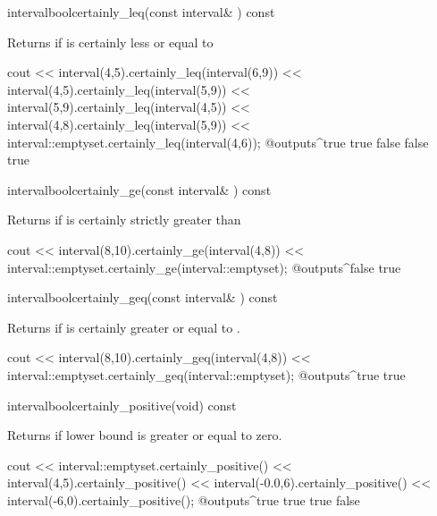\documentclass{manual}
\newcommand{\itv}[2]{\ensuremath{[#1,\,#2]}}
\let\leq=\leqslant
\let\geq=\geqslant
\begin{document}
\begin{defmethod}{interval}{bool}{certainly\_leq}{(const interval\& ) const}
  \begin{operation}
    \op{$\forall x\in \code{self}, \forall y \in \var{I}\colon x\leq y$}
  \end{operation}
  Returns  if  is certainly less or equal to 
  \begin{example}
cout << interval(4,5).certainly_leq(interval(6,9))
     << interval(4,5).certainly_leq(interval(5,9))
     << interval(5,9).certainly_leq(interval(4,5))
     << interval(4,8).certainly_leq(interval(5,9))
     << interval::emptyset.certainly_leq(interval(4,6));
@outputs^true true false false true~
\end{example}
\end{defmethod}

\begin{defmethod}{interval}{bool}{certainly\_ge}{(const interval\& ) const}
  \begin{operation}
  \end{operation}
  Returns  if  is certainly strictly greater than 
  \begin{example}
cout << interval(8,10).certainly_ge(interval(4,8))
     << interval::emptyset.certainly_ge(interval::emptyset);
@outputs^false true~
  \end{example}
\end{defmethod}

\begin{defmethod}{interval}{bool}{certainly\_geq}{(const interval\& ) const}
  \begin{operation}
    \op{$\forall x\in \code{self}, \forall y \in \var{I}\colon x\geq y$}
  \end{operation}
  Returns  if  is certainly greater or equal to .
  \begin{example}
cout << interval(8,10).certainly_geq(interval(4,8))
     << interval::emptyset.certainly_geq(interval::emptyset);
@outputs^true true~
  \end{example}
\end{defmethod}

\begin{defmethod}{interval}{bool}{certainly\_positive}{(void) const}
  \begin{operation}
    \op{$\code{self}\subseteq\itv{0}{+\infty}$}
  \end{operation}
Returns  if  lower bound is greater or equal to zero.
\begin{example}
cout << interval::emptyset.certainly_positive()
     << interval(4,5).certainly_positive()
     << interval(-0.0,6).certainly_positive()
     << interval(-6,0).certainly_positive();
@outputs^true true true false~
\end{example}
\end{defmethod}
\end{document}
